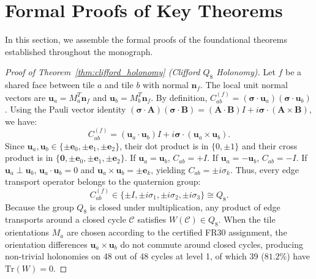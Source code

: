 \documentclass[11pt,a4paper]{article}
\theoremstyle{definition}
\newcommand{\Tr}{\mathrm{Tr}}
\begin{document}
\section{Formal Proofs of Key Theorems}

In this section, we assemble the formal proofs of the foundational theorems established throughout the monograph.

\begin{proof}[Proof of Theorem~\ref{thm:clifford_holonomy} (Clifford $Q_8$ Holonomy)]
Let $f$ be a shared face between tile $a$ and tile $b$ with normal $\mathbf{n}_f$. The local unit normal vectors are $\mathbf{u}_a = M_a^T \mathbf{n}_f$ and $\mathbf{u}_b = M_b^T \mathbf{n}_f$. 
By definition, $C_{ab}^{(f)} = (\boldsymbol{\sigma} \cdot \mathbf{u}_a)(\boldsymbol{\sigma} \cdot \mathbf{u}_b)$. 
Using the Pauli vector identity $(\boldsymbol{\sigma}\cdot\mathbf{A})(\boldsymbol{\sigma}\cdot\mathbf{B}) = (\mathbf{A}\cdot\mathbf{B})I + i\boldsymbol{\sigma}\cdot(\mathbf{A}\times\mathbf{B})$, we have:
\begin{equation}
C_{ab}^{(f)} = (\mathbf{u}_a \cdot \mathbf{u}_b)I + i\boldsymbol{\sigma}\cdot(\mathbf{u}_a \times \mathbf{u}_b).
\end{equation}
Since $\mathbf{u}_a, \mathbf{u}_b \in \{\pm \mathbf{e}_0, \pm \mathbf{e}_1, \pm \mathbf{e}_2\}$, their dot product is in $\{0, \pm 1\}$ and their cross product is in $\{\mathbf{0}, \pm \mathbf{e}_0, \pm \mathbf{e}_1, \pm \mathbf{e}_2\}$. 
If $\mathbf{u}_a = \mathbf{u}_b$, $C_{ab} = +I$. If $\mathbf{u}_a = -\mathbf{u}_b$, $C_{ab} = -I$. 
If $\mathbf{u}_a \perp \mathbf{u}_b$, $\mathbf{u}_a \cdot \mathbf{u}_b = 0$ and $\mathbf{u}_a \times \mathbf{u}_b = \pm \mathbf{e}_k$, yielding $C_{ab} = \pm i \sigma_k$. 
Thus, every edge transport operator belongs to the quaternion group:
\begin{equation}
C_{ab}^{(f)} \in \{\pm I, \pm i\sigma_1, \pm i\sigma_2, \pm i\sigma_3\} \cong Q_8.
\end{equation}
Because the group $Q_8$ is closed under multiplication, any product of edge transports around a closed cycle $\mathcal{C}$ satisfies $W(\mathcal{C}) \in Q_8$. 
When the tile orientations $M_a$ are chosen according to the certified FR30 assignment, the orientation differences $\mathbf{u}_a \times \mathbf{u}_b$ do not commute around closed cycles, producing non-trivial holonomies on 48 out of 48 cycles at level 1, of which 39 ($81.2\%$) have $\Tr(W) = 0$.
\end{proof}
\end{document}
